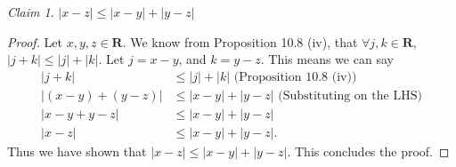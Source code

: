 \documentclass[12pt,oneside]{amsart}
\theoremstyle{remark}
\newtheorem{claim}{Claim}[exer]
\newcommand{\bfR}{\mathbf{R}}
\begin{document}
\begin{claim}
$|x - z| \leq |x - y| + |y - z|$
\end{claim}
\begin{proof}
Let $x,y,z \in \bfR$. We know from Proposition 10.8 (iv), that $\forall j,k \in \bfR$, $|j + k| \leq |j| + |k|$. Let $j = x - y$, and $k = y - z$. This means we can say
\begin{align*}
            |j + k| &\leq |j| + |k| \text{ (Proposition 10.8 (iv))} \\
|(x - y) + (y - z)| &\leq |x - y| + |y - z| \text{ (Substituting on the LHS)} \\
    |x - y + y - z| &\leq |x - y| + |y - z| \\
            |x - z| &\leq |x - y| + |y - z|.
\end{align*}
Thus we have shown that $|x - z| \leq |x - y| + |y - z|$. This concludes the proof.
\end{proof}
\end{document}
